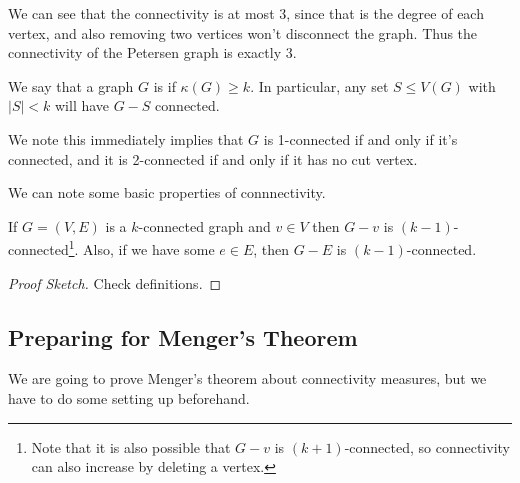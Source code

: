 \begin{example}
\begin{center}

	\end{center}
We can see that the connectivity is at most $3$, since that is the degree of each vertex, and also removing two vertices won't disconnect the graph. Thus the connectivity of the Petersen graph is exactly 3.
\end{example}

\begin{definition}[$k$-Connected]
We say that a graph $G$ is  if $\kappa(G) \geq k$. In particular, any set $S \leq V(G)$ with $|S| < k$	will have $G - S$ connected.
\end{definition}

We note this immediately implies that $G$ is 1-connected if and only if it's connected, and it is 2-connected if and only if it has no cut vertex.

We can note some basic properties of connnectivity.

\begin{lemma}
	If $G = (V, E)$ is a $k$-connected graph and $v \in V$ then $G - v$ is $(k - 1)$-connected\footnote{Note that it is also possible that $G - v$ is $(k + 1)$-connected, so connectivity can also increase by deleting a vertex.}. 
	Also, if we have some $e \in E$, then $G - E$ is $(k - 1)$-connected.
\end{lemma}
\begin{proof}[Proof Sketch]
Check definitions.
\end{proof}

\subsection{Preparing for Menger's Theorem}

We are going to prove Menger's theorem about connectivity measures, but we have to do some setting up beforehand.

